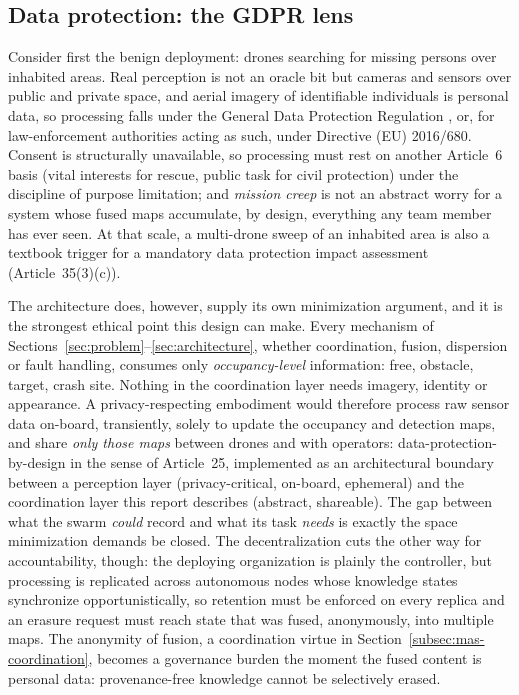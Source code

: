 \subsection{Data protection: the GDPR lens}
\label{subsec:eth-gdpr}

Consider first the benign deployment: drones searching for missing persons over
inhabited areas. Real perception is not an oracle bit but cameras and sensors
over public and private space, and aerial imagery of identifiable individuals is
personal data, so processing falls under the General Data Protection Regulation
\citep{gdpr2016}, or, for law-enforcement authorities acting as such, under
Directive (EU) 2016/680. Consent is structurally unavailable, so processing must
rest on another Article~6 basis (vital interests for rescue, public task for
civil protection) under the discipline of purpose limitation; and \emph{mission
creep} is not an abstract worry for a system whose fused maps accumulate, by
design, everything any team member has ever seen. At that scale, a multi-drone
sweep of an inhabited area is also a textbook trigger for a mandatory data
protection impact assessment (Article~35(3)(c)).

The architecture does, however, supply its own minimization argument, and it is
the strongest ethical point this design can make. Every mechanism of
Sections~\ref{sec:problem}--\ref{sec:architecture}, whether coordination,
fusion, dispersion or fault handling, consumes only \emph{occupancy-level}
information: free, obstacle, target, crash site. Nothing in the coordination
layer needs imagery, identity or appearance. A privacy-respecting embodiment
would therefore process raw sensor data on-board, transiently, solely to update
the occupancy and detection maps, and share \emph{only those maps} between drones
and with operators: data-protection-by-design in the sense of Article~25,
implemented as an architectural boundary between a perception layer
(privacy-critical, on-board, ephemeral) and the coordination layer this report
describes (abstract, shareable). The gap between what the swarm \emph{could}
record and what its task \emph{needs} is exactly the space minimization demands
be closed. The decentralization cuts the other way for accountability, though:
the deploying organization is plainly the controller, but processing is
replicated across autonomous nodes whose knowledge states synchronize
opportunistically, so retention must be enforced on every replica and an erasure
request must reach state that was fused, anonymously, into multiple maps. The
anonymity of fusion, a coordination virtue in
Section~\ref{subsec:mas-coordination}, becomes a governance burden the moment
the fused content is personal data: provenance-free knowledge cannot be
selectively erased.


